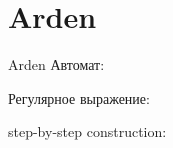 \section{Arden}
\begin{frame}{Arden}
	Автомат:


	Регулярное выражение:

	step-by-step construction:


\end{frame}
